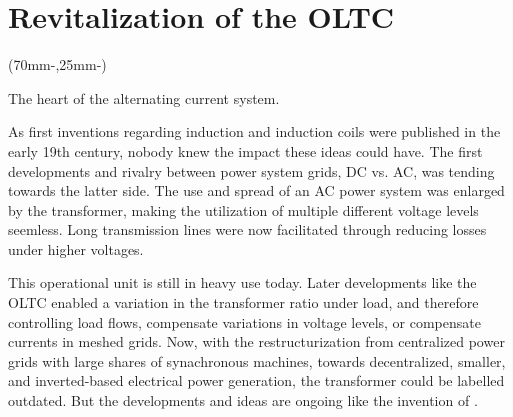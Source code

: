 \begingroup
\chapter{Revitalization of the OLTC} %
\label{chap:intro}

\begin{textblock*}{.7\textwidth}(70mm-\offset,25mm-\offset)%
    \begin{fquote}
        The heart of the alternating current system.
    \end{fquote}
\end{textblock*}

\endgroup

As first inventions regarding induction and induction coils were published in the early 19th century, nobody knew the impact these ideas could have.
The first developments and rivalry between power system grids, \acf{DC} vs. \acf{AC}, was tending towards the latter side.
The use and spread of an \acs{AC} power system was enlarged by the transformer, making the utilization of multiple different voltage levels seemless.
Long transmission lines were now facilitated through reducing losses under higher voltages. \autocite{hughes_1993,hurley_2014}

This operational unit is still in heavy use today.
Later developments like the \acf{OLTC} enabled a variation in the transformer ratio under load, and therefore controlling load flows, compensate variations in voltage levels, or compensate currents in meshed grids. \autocite{schwab_2022}
Now, with the restructurization from centralized power grids with large shares of synachronous machines, towards decentralized, smaller, and inverted-based electrical power generation, the transformer could be labelled outdated.
But the developments and ideas are ongoing like the invention of \textcite{maschinenfabrikreinhausengmbh_2023}.

